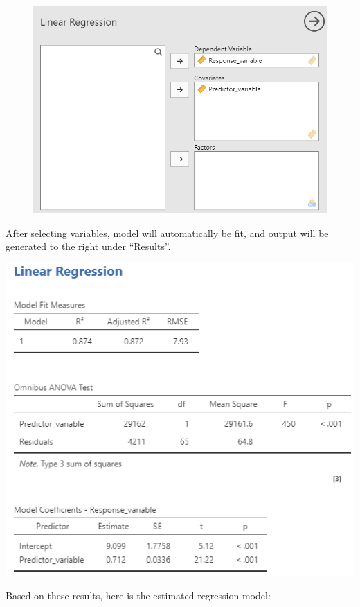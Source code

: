 \documentclass[
  letterpaper,
  DIV=11,
  numbers=noendperiod]{scrreprt}
\begin{document}
\begin{figure}

{\centering \includegraphics{images/mod2_pt1 (14).png}

}

\end{figure}

After selecting variables, model will automatically be fit, and output
will be generated to the right under ``Results''.

\includegraphics{images/mod2_pt1 (17).png}

Based on these results, here is the estimated regression model:
\end{document}
